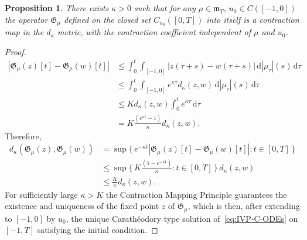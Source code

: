 \documentclass[reqno]{amsart}
\theoremstyle{plain}
\newtheorem{proposition}{Proposition}[section]
\numberwithin{equation}{section}
\numberwithin{definition}{section}
\newcommand{\dd}{\ensuremath{\mathrm{d}}}
\begin{document}
\begin{proposition}
\label{prop:contraction-ODEs}
There exists $\kappa > 0$ such that for any $\mu\in \mathfrak{m}_T$, $u_0 \in C([-1, 0])$ the operator $\mathfrak{G}_{\mu}$ defined on the closed set $C_{u_0}([0,T])$ into itself is a contraction map in the $d_{\kappa}$ metric, with the contraction coefficient independent of $\mu$ and $u_0$.
\end{proposition}
\begin{proof}
    \begin{equation*}
        \begin{split}
             |\mathfrak{G}_{\mu}(z)[t]   -  \mathfrak{G}_{\mu}(w)[t] | &  \le  \int_{0}^{t}  \int_{[-1,0]} | z(\tau+s) -  w(\tau+s) | \, \dd |\mu_{\tau}|(s)  \, \dd\tau  \\
    & \le   \int_{0}^{t}  \int_{[-1,0]} e^{\kappa \tau} d_{\kappa}(z,w)  \, \dd |\mu_{\tau}|(s) \,\dd\tau \\
    & \le  K  d_{\kappa}(z,w) \int_{0}^{t}  e^{\kappa \tau} \,\dd\tau  \\
    & = K \frac{(e^{\kappa t}-1)}{\kappa} d_{\kappa}(z,w). 
        \end{split}
    \end{equation*}
Therefore, 
\begin{align*}  d_{\kappa}(\mathfrak{G}_{\mu}(z) , \mathfrak{G}_{\mu}(w)) & = \sup{\{\, e^{-{\kappa}t}  |\mathfrak{G}_{\mu}(z)[t]   - \mathfrak{G}_{\mu}(w)[t] | : t \in [0, T] \,\}} \\
        &\le \sup{\Big\{\,  K\frac{(1-e^{-{\kappa}t})}{\kappa} : t \in [0, T] \,\Big\}} \, d_{\kappa}(z,w)\\
        &\le \frac{K}{\kappa} d_{\kappa}(z,w). 
\end{align*}
For sufficiently large $\kappa>K$ the Contraction Mapping Principle guarantees the existence and uniqueness of the fixed point $z$ of $\mathfrak{G}_{\mu}$, which is then, after extending to $[-1, 0]$ by $u_0$, the unique  Carath\'{e}odory type solution of~\eqref{eq:IVP-C-ODEs} on $[-1, T]$ satisfying the initial condition.
\end{proof}
\end{document}
